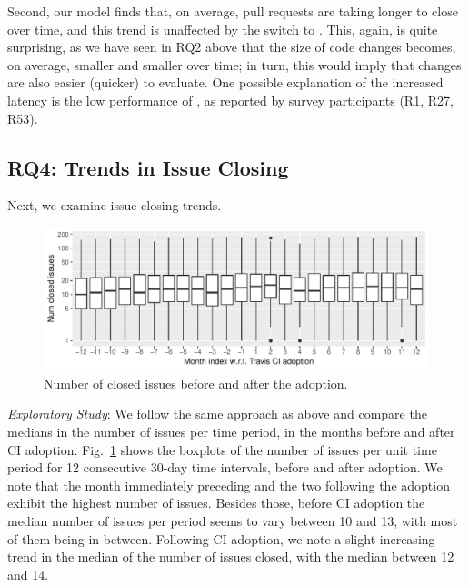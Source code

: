 Second, our model finds that, on average, pull requests are taking longer to close 
over time, and this trend is unaffected by the switch to \Tvis.
This, again, is quite surprising, as we have seen in RQ2 above that the size of 
code changes becomes, on average, smaller and smaller over time; in turn, this
would imply that changes are also easier (quicker) to evaluate.
One possible explanation of the increased latency is the low performance of \Tvis, 
as reported by survey participants (R1, R27, R53).


\subsection{RQ4: Trends in Issue Closing}

Next, we examine issue closing trends.

\begin{figure}[t]
\centering
\includegraphics[width=\columnwidth, clip=true, trim=0 0 0 0]{figures/issues-closed.pdf}
\caption{Number of closed issues before and after the \Tvis adoption.}
\label{fig:issues}\vspace{-0.4cm}
\end{figure}






%
%
%

\smallskip\noindent \emph{Exploratory Study}:
We follow the same approach as above and compare the 
medians in the number of issues per time period, in the months before and after CI adoption.
Fig.~\ref{fig:issues} shows the boxplots of the number of 
issues per unit time period for 12 consecutive 30-day time intervals, before and after \Tvis adoption.
We note that the month immediately preceding 
and the two following the adoption exhibit the highest number of issues.
Besides those, before CI adoption the median number of issues per period seems to vary between 10 and 13, with most of them being in between.
Following CI adoption, we note a slight increasing trend in the median of the number of issues closed, with the median between 12 and 14.

